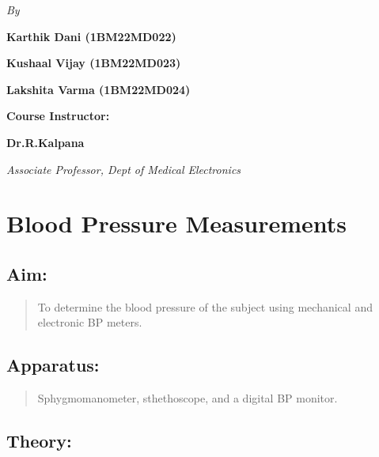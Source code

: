 \documentclass[
  11pt,
  letterpaper,
  DIV=11,
  numbers=noendperiod]{scrreprt}
\begin{document}
\begin{center}
    \textit{By}
\end{center}

\begin{center}
    \textbf{Karthik Dani (1BM22MD022)}
\end{center}
\begin{center}
    \textbf{Kushaal Vijay (1BM22MD023)}
\end{center}
\begin{center}
    \textbf{Lakshita Varma (1BM22MD024)}
\end{center}

\begin{center}
    \large \textbf{Course Instructor:}
\end{center}

\begin{center}
    \textbf{Dr.R.Kalpana}
\end{center}

\begin{center} 
  \textit{Associate Professor, Dept of Medical Electronics}
\end{center}


\chapter{Blood Pressure Measurements}\label{blood-pressure-measurements}

\section{Aim:}\label{aim}

\begin{quote}
To determine the blood pressure of the subject using mechanical and
electronic BP meters.
\end{quote}

\section{Apparatus:}\label{apparatus}

\begin{quote}
Sphygmomanometer, sthethoscope, and a digital BP monitor.
\end{quote}

\section{Theory:}\label{theory}
\end{document}
